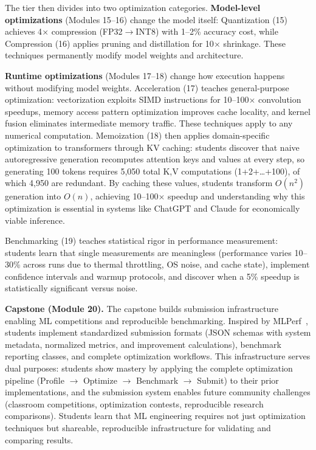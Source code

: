 \documentclass[10pt,twocolumn]{article}
\begin{document}
The tier then divides into two optimization categories. \textbf{Model-level optimizations} (Modules 15--16) change the model itself: Quantization (15) achieves 4$\times$ compression (FP32$\rightarrow$INT8) with 1--2\% accuracy cost, while Compression (16) applies pruning and distillation for 10$\times$ shrinkage. These techniques permanently modify model weights and architecture.

\textbf{Runtime optimizations} (Modules 17--18) change how execution happens without modifying model weights. Acceleration (17) teaches general-purpose optimization: vectorization exploits SIMD instructions for 10--100$\times$ convolution speedups, memory access pattern optimization improves cache locality, and kernel fusion eliminates intermediate memory traffic. These techniques apply to any numerical computation. Memoization (18) then applies domain-specific optimization to transformers through KV caching: students discover that naive autoregressive generation recomputes attention keys and values at every step, so generating 100 tokens requires 5,050 total K,V computations (1+2+\dots+100), of which 4,950 are redundant. By caching these values, students transform $O(n^2)$ generation into $O(n)$, achieving 10--100$\times$ speedup and understanding why this optimization is essential in systems like ChatGPT and Claude for economically viable inference.

Benchmarking (19) teaches statistical rigor in performance measurement: students learn that single measurements are meaningless (performance varies 10--30\% across runs due to thermal throttling, OS noise, and cache state), implement confidence intervals and warmup protocols, and discover when a 5\% speedup is statistically significant versus noise.

\textbf{Capstone (Module 20).}
The capstone builds submission infrastructure enabling ML competitions and reproducible benchmarking. Inspired by MLPerf~\citep{mattson2020mlperf, reddi2020}, students implement standardized submission formats (JSON schemas with system metadata, normalized metrics, and improvement calculations), benchmark reporting classes, and complete optimization workflows. This infrastructure serves dual purposes: students show mastery by applying the complete optimization pipeline (Profile $\rightarrow$ Optimize $\rightarrow$ Benchmark $\rightarrow$ Submit) to their prior implementations, and the submission system enables future community challenges (classroom competitions, optimization contests, reproducible research comparisons). Students learn that ML engineering requires not just optimization techniques but shareable, reproducible infrastructure for validating and comparing results.
\end{document}
